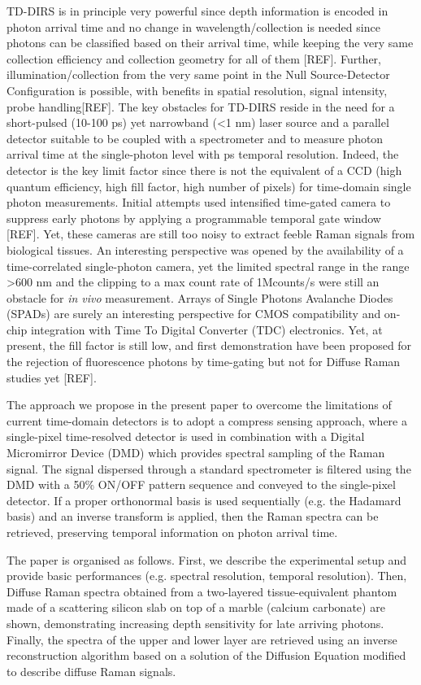 \documentclass{osa-article}
\begin{document}
TD-DIRS is in principle very powerful since depth information is encoded in photon arrival time and no change in wavelength/collection is needed since photons can be classified based on their arrival time, while keeping the very same collection efficiency and collection geometry for all of them [REF]. Further, illumination/collection from the very same point in the Null Source-Detector Configuration is possible, with benefits in spatial resolution, signal intensity, probe handling[REF]. The key obstacles for TD-DIRS reside in the need for a short-pulsed (10-100 ps) yet narrowband (<1 nm) laser source and a parallel detector suitable to be coupled with a spectrometer and to measure photon arrival time at the single-photon level with ps temporal resolution. Indeed, the detector is the key limit factor since there is not the equivalent of a CCD (high quantum efficiency, high fill factor, high number of pixels) for time-domain single photon measurements. Initial attempts used intensified time-gated camera to suppress early photons by applying a programmable temporal gate window [REF]. Yet, these cameras are still too noisy to extract feeble Raman signals from biological tissues. An interesting perspective was opened by the availability of a time-correlated single-photon camera, yet the limited spectral range in the range >600 nm and the clipping to a max count rate of 1Mcounts/s were still an obstacle for \emph{in vivo} measurement. Arrays of Single Photons Avalanche Diodes (SPADs) are surely an interesting perspective for CMOS compatibility and on-chip integration with Time To Digital Converter (TDC) electronics. Yet, at present, the fill factor is still low, and first demonstration have been proposed for the rejection of fluorescence photons by time-gating but not for Diffuse Raman studies yet [REF].

The approach we propose in the present paper to overcome the limitations of current time-domain detectors is to adopt a compress sensing approach, where a single-pixel time-resolved detector is used in combination with a Digital Micromirror Device (DMD) which provides spectral sampling of the Raman signal. The signal dispersed through a standard spectrometer is filtered using the DMD with a 50\% ON/OFF pattern sequence and conveyed to the single-pixel detector. If a proper orthonormal basis is used sequentially (e.g. the Hadamard basis) and an inverse transform is applied, then the Raman spectra can be retrieved, preserving temporal information on photon arrival time.

The paper is organised as follows. First, we describe the experimental setup and provide basic performances (e.g. spectral resolution, temporal resolution). Then, Diffuse Raman spectra obtained from a two-layered tissue-equivalent phantom made of a scattering silicon slab on top of a marble (calcium carbonate) are shown, demonstrating increasing depth sensitivity for late arriving photons. Finally, the spectra of the upper and lower layer are retrieved using an inverse reconstruction algorithm based on a solution of the Diffusion Equation modified to describe diffuse Raman signals.
\end{document}

